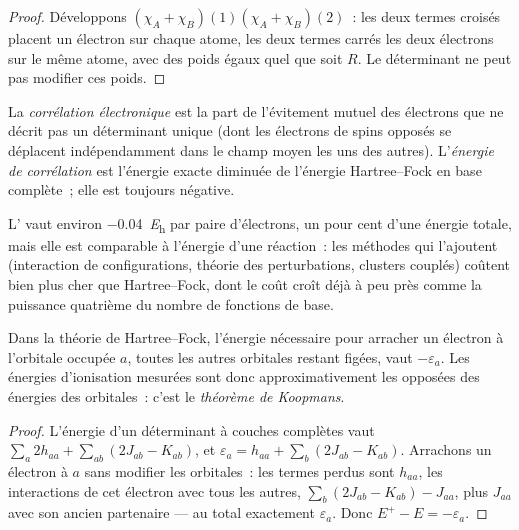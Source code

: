 \begin{proof}
Développons $(\chi_A + \chi_B)(1)(\chi_A + \chi_B)(2)$~: les deux termes
croisés placent un électron sur chaque atome, les deux termes carrés les
deux électrons sur le même atome, avec des poids égaux quel que soit
$R$. Le déterminant ne peut pas modifier ces poids.
\end{proof}

\begin{definition}\label{def:b3:computational-chemistry:correlation}
La \emph{corrélation électronique} est la part de
l'évitement mutuel des électrons que ne décrit pas un déterminant unique
(dont les électrons de spins opposés se déplacent indépendamment dans le
champ moyen les uns des autres). L'\emph{énergie de
corrélation} est
l'énergie exacte diminuée de l'énergie Hartree--Fock en base complète~;
elle est toujours négative.
\end{definition}

L' vaut environ \qty{-0.04}{\hartree} par paire
d'électrons, un pour cent d'une énergie totale, mais elle est comparable
à l'énergie d'une réaction~: les méthodes qui l'ajoutent (interaction de
configurations, théorie des perturbations, clusters couplés) coûtent bien
plus cher que Hartree--Fock, dont le coût croît déjà à peu près comme la
puissance quatrième du nombre de fonctions de base.

\begin{theorem}\label{thm:b3:computational-chemistry:koopmans}
Dans la théorie de Hartree--Fock, l'énergie nécessaire pour arracher un
électron à l'orbitale occupée $a$, toutes les autres orbitales restant
figées, vaut $-\varepsilon_a$. Les énergies d'ionisation mesurées sont
donc approximativement les opposées des énergies des orbitales~: c'est
le \emph{théorème de Koopmans}.
\end{theorem}

\begin{proof}
L'énergie d'un déterminant à couches complètes vaut $\sum_a2h_{aa} + \sum_{ab}(2J_{ab} -
K_{ab})$, et $\varepsilon_a = h_{aa} + \sum_b(2J_{ab} - K_{ab})$. Arrachons
un électron à $a$ sans modifier les orbitales~: les termes perdus sont
$h_{aa}$, les interactions de cet électron avec tous les autres,
$\sum_b(2J_{ab} - K_{ab}) -
J_{aa}$, plus $J_{aa}$ avec son ancien partenaire --- au total exactement
$\varepsilon_a$. Donc $E^+ - E = -\varepsilon_a$.
\end{proof}

